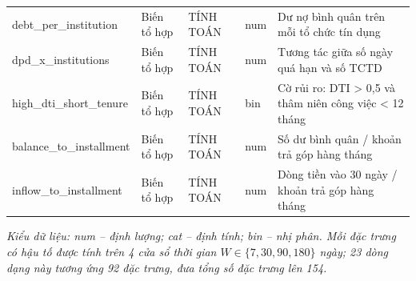 \begin{longtable}{@{}L{3.761cm}L{2.121cm}L{2.314cm}L{1.061cm}L{4.918cm}@{}}
debt\_\allowbreak per\_\allowbreak institution & Biến tổ hợp & TÍNH TOÁN & num & Dư nợ bình quân trên mỗi tổ chức tín dụng \\
dpd\_\allowbreak x\_\allowbreak institutions & Biến tổ hợp & TÍNH TOÁN & num & Tương tác giữa số ngày quá hạn và số TCTD \\
high\_\allowbreak dti\_\allowbreak short\_\allowbreak tenure & Biến tổ hợp & TÍNH TOÁN & bin & Cờ rủi ro: DTI > 0,5 và thâm niên công việc < 12 tháng \\
balance\_\allowbreak to\_\allowbreak installment & Biến tổ hợp & TÍNH TOÁN & num & Số dư bình quân / khoản trả góp hàng tháng \\
inflow\_\allowbreak to\_\allowbreak installment & Biến tổ hợp & TÍNH TOÁN & num & Dòng tiền vào 30 ngày / khoản trả góp hàng tháng \\
\end{longtable}

{\footnotesize\itshape Kiểu dữ liệu: num -- định lượng; cat -- định tính; bin -- nhị phân. Mỗi đặc trưng có hậu tố  được tính trên 4 cửa sổ thời gian $W \in \{7, 30, 90, 180\}$ ngày; 23 dòng dạng này tương ứng 92 đặc trưng, đưa tổng số đặc trưng lên 154.}
\endgroup
